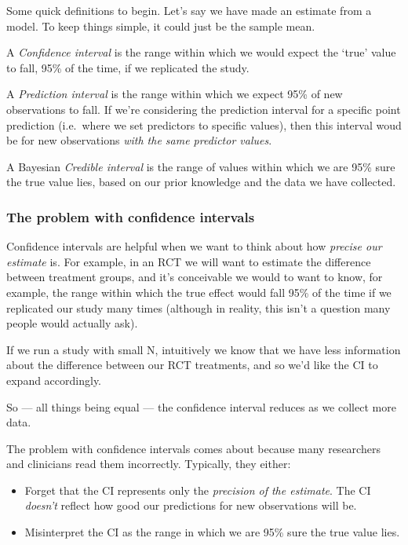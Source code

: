 \documentclass[]{article}
\begin{document}
Some quick definitions to begin. Let's say we have made an estimate from a
model. To keep things simple, it could just be the sample mean.

A \emph{Confidence interval} is the range within which we would expect the `true'
value to fall, 95\% of the time, if we replicated the study.

A \emph{Prediction interval} is the range within which we expect 95\% of new
observations to fall. If we're considering the prediction interval for a
specific point prediction (i.e.~where we set predictors to specific values),
then this interval woud be for new observations \emph{with the same predictor
values}.

A Bayesian \emph{Credible interval} is the range of values within which we are 95\%
sure the true value lies, based on our prior knowledge and the data we have
collected.

\hypertarget{the-problem-with-confidence-intervals}{%
\subsubsection*{The problem with confidence intervals}\label{the-problem-with-confidence-intervals}}

Confidence intervals are helpful when we want to think about how \emph{precise our
estimate} is. For example, in an RCT we will want to estimate the difference
between treatment groups, and it's conceivable we would to want to know, for
example, the range within which the true effect would fall 95\% of the time if we
replicated our study many times (although in reality, this isn't a question many
people would actually ask).

If we run a study with small N, intuitively we know that we have less
information about the difference between our RCT treatments, and so we'd like
the CI to expand accordingly.

So --- all things being equal --- the confidence interval reduces as we collect more
data.

The problem with confidence intervals comes about because many researchers and
clinicians read them incorrectly. Typically, they either:

\begin{itemize}
\item
  Forget that the CI represents only the \emph{precision of the estimate}. The CI
  \emph{doesn't} reflect how good our predictions for new observations will be.
\item
  Misinterpret the CI as the range in which we are 95\% sure the true value
  lies.
\end{itemize}
\end{document}
